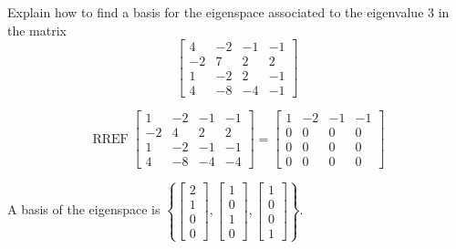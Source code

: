 
\begin{exerciseStatement}


Explain how to find a basis for the eigenspace associated to the eigenvalue \( 3 \) in the matrix \[ \left[\begin{array}{cccc}
4 & -2 & -1 & -1 \\
-2 & 7 & 2 & 2 \\
1 & -2 & 2 & -1 \\
4 & -8 & -4 & -1
\end{array}\right] \]


\end{exerciseStatement}
    
\begin{exerciseAnswer} 


\[\operatorname{RREF} \left[\begin{array}{cccc}
1 & -2 & -1 & -1 \\
-2 & 4 & 2 & 2 \\
1 & -2 & -1 & -1 \\
4 & -8 & -4 & -4
\end{array}\right] = \left[\begin{array}{cccc}
1 & -2 & -1 & -1 \\
0 & 0 & 0 & 0 \\
0 & 0 & 0 & 0 \\
0 & 0 & 0 & 0
\end{array}\right] \]



A basis of the eigenspace is \( \left\{ \left[\begin{array}{c}
2 \\
1 \\
0 \\
0
\end{array}\right] , \left[\begin{array}{c}
1 \\
0 \\
1 \\
0
\end{array}\right] , \left[\begin{array}{c}
1 \\
0 \\
0 \\
1
\end{array}\right] \right\} \).


\end{exerciseAnswer}
    
